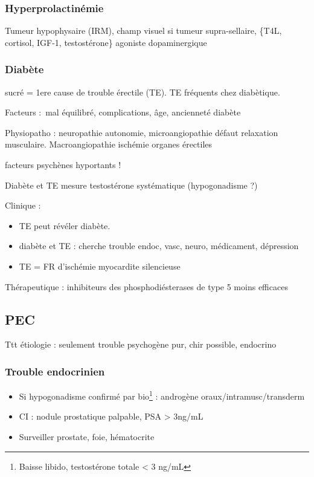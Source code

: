 \documentclass[11pt]{article}
\begin{document}
\subsubsection{Hyperprolactinémie}
\label{sec:org15b91d3}
Tumeur hypophysaire (IRM), champ visuel si tumeur
supra-sellaire, \{T4L, cortisol, IGF-1, testostérone\}
\thus agoniste dopaminergique

\subsubsection{Diabète}
\label{sec:orgda5d0d3}
sucré = 1ere cause de trouble érectile (TE). TE fréquents chez diabètique. 

Facteurs : mal équilibré, complications, âge, ancienneté diabète

Physiopatho : neuropathie autonomie, microangiopathie \thus défaut relaxation
musculaire. Macroangiopathie \thus ischémie organes érectiles

\danger facteurs psychènes hyportants !

Diabète et TE \thus mesure testostérone systématique (hypogonadisme ?)

Clinique : 
\begin{itemize}
\item TE peut révéler diabète.
\item diabète et TE : cherche trouble endoc, vasc, neuro, médicament, dépression
\item TE = FR d'ischémie myocardite silencieuse \danger
\end{itemize}

Thérapeutique : inhibiteurs des phosphodiésterases de type 5 moins efficaces

\subsection{PEC}
\label{sec:orgce93338}
Ttt étiologie : seulement trouble psychogène pur, chir possible, endocrino

\subsubsection{Trouble endocrinien}
\label{sec:orgd2e8995}
\begin{itemize}
\item Si hypogonadisme confirmé par bio\footnote{Baisse libido, testostérone totale < 3 ng/mL} : androgène oraux/intramusc/transderm
\item CI : nodule prostatique palpable, PSA > 3ng/mL
\item Surveiller prostate, foie, hématocrite
\end{itemize}
\end{document}
